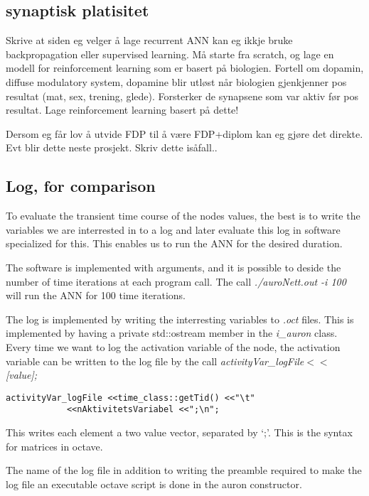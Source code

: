 	\subsection{synaptisk platisitet}
	Skrive at siden eg velger å lage recurrent ANN kan eg ikkje bruke backpropagation eller supervised learning. Må starte fra scratch, og lage en modell for reinforcement learning som er basert på biologien. 
	Fortell om dopamin, diffuse modulatory system, dopamine blir utløst når biologien gjenkjenner pos resultat (mat, sex, trening, glede). Forsterker de synapsene som var aktiv før pos resultat. 
	Lage reinforcement learning basert på dette!

	Dersom eg får lov å utvide FDP til å være FDP+diplom kan eg gjøre det direkte. Evt blir dette neste prosjekt. Skriv dette isåfall..




\subsection{Log, for comparison}
To evaluate the transient time course of the nodes values, the best is to write the variables we are interrested in to a log and later evaluate this log in software specialized for this.
This enables us to run the ANN for the desired duration. 

The software is implemented with arguments, and it is possible to deside the number of time iterations at each program call.
The call \emph{./auroNett.out -i 100} will run the ANN for 100 time iterations.

The log is implemented by writing the interresting variables to \emph{.oct} files. This is implemented by having a private std::ostream member in the \emph{i\_auron} class.
Every time we want to log the activation variable of the node, the activation variable can be written to the log file by the call \emph{activityVar\_logFile$<<$ [value];}
\begin{lstlisting}
activityVar_logFile <<time_class::getTid() <<"\t" 
  		    <<nAktivitetsVariabel <<";\n";
\end{lstlisting}

This writes each element a two value vector, separated by `;'. This is the syntax for matrices in octave.

The name of the log file in addition to writing the preamble required to make the log file an executable octave script is done in the auron constructor.

